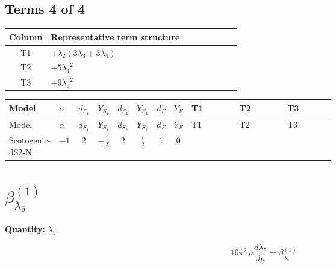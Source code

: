 \documentclass[8pt]{article}
\begin{document}
\begin{landscape}
\subsection*{Terms 4 of 4}
\begin{center}
\begin{tabular}{@{}c >{\raggedright\arraybackslash}p{0.82\linewidth}@{}}
\toprule
Column & Representative term structure \\
\midrule
T1 & \(\displaystyle +{\lambda_2} (3 {\lambda_3}+3 {\lambda_4})\) \\
\midrule
T2 & \(\displaystyle +5 {\lambda_4}^2\) \\
\midrule
T3 & \(\displaystyle +9 {\lambda_5}^2\) \\
\midrule
\bottomrule
\end{tabular}
\end{center}
\smallskip
\tiny
\begin{longtable}{@{}llcccccc >{\raggedright\arraybackslash}p{0.21\linewidth} >{\raggedright\arraybackslash}p{0.21\linewidth} >{\raggedright\arraybackslash}p{0.21\linewidth}@{}}
\toprule
Model & $\alpha$ & $d_{S_1}$ & $Y_{S_1}$ & $d_{S_2}$ & $Y_{S_2}$ & $d_F$ & $Y_F$ & T1 & T2 & T3 \\
\midrule
\endfirsthead
\toprule
Model & $\alpha$ & $d_{S_1}$ & $Y_{S_1}$ & $d_{S_2}$ & $Y_{S_2}$ & $d_F$ & $Y_F$ & T1 & T2 & T3 \\
\midrule
\endhead
Scotogenic-dS2-N & $-1$ & $2$ & $-\frac{1}{2}$ & $2$ & $\frac{1}{2}$ & $1$ & $0$ & \scriptsize\adjustbox{max width=\linewidth}{$\begin{gathered} +{\lambda_2} (3 {\lambda_3}+3 {\lambda_4})\end{gathered}$} & \scriptsize\adjustbox{max width=\linewidth}{$\begin{gathered} +5 {\lambda_4}^2\end{gathered}$} & \scriptsize\adjustbox{max width=\linewidth}{$\begin{gathered} +9 {\lambda_5}^2\end{gathered}$} \\
\midrule
\bottomrule
\end{longtable}
\clearpage
\section*{$\beta_{\lambda_5}^{(1)}$}
\noindent\textbf{Quantity: }$\lambda_5$\par\smallskip
\[16\pi^2\,\mu\frac{d \lambda_5}{d\mu}=\beta_{\lambda_5}^{(1)}\]

\end{landscape}
\end{document}
